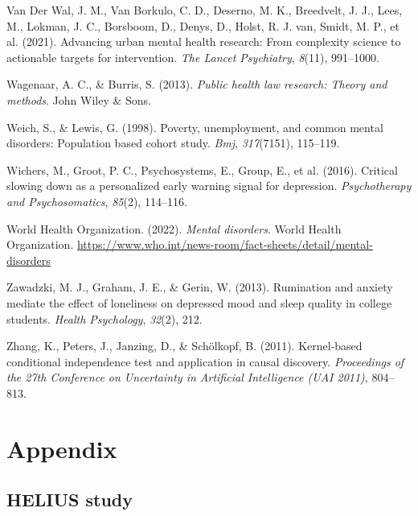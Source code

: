 \documentclass[
]{article}
\newlength{\cslhangindent}
\newenvironment{CSLReferences}[2] %
 {\begin{list}{}{%
  \setlength{\itemindent}{0pt}
  \setlength{\leftmargin}{0pt}
  \setlength{\parsep}{0pt}
  \ifodd #1
   \setlength{\leftmargin}{\cslhangindent}
   \setlength{\itemindent}{-1\cslhangindent}
  \fi
  \setlength{\itemsep}{#2\baselineskip}}}
 {\end{list}}
\begin{document}
\begin{CSLReferences}{1}{0}
Van Der Wal, J. M., Van Borkulo, C. D., Deserno, M. K., Breedvelt, J.
J., Lees, M., Lokman, J. C., Borsboom, D., Denys, D., Holst, R. J. van,
Smidt, M. P., et al. (2021). Advancing urban mental health research:
From complexity science to actionable targets for intervention.
\emph{The Lancet Psychiatry}, \emph{8}(11), 991--1000.

Wagenaar, A. C., \& Burris, S. (2013). \emph{Public health law research:
Theory and methods}. John Wiley \& Sons.

Weich, S., \& Lewis, G. (1998). Poverty, unemployment, and common mental
disorders: Population based cohort study. \emph{Bmj}, \emph{317}(7151),
115--119.

Wichers, M., Groot, P. C., Psychosystems, E., Group, E., et al. (2016).
Critical slowing down as a personalized early warning signal for
depression. \emph{Psychotherapy and Psychosomatics}, \emph{85}(2),
114--116.

World Health Organization. (2022). \emph{Mental disorders}. World Health
Organization.
\url{https://www.who.int/news-room/fact-sheets/detail/mental-disorders}

Zawadzki, M. J., Graham, J. E., \& Gerin, W. (2013). Rumination and
anxiety mediate the effect of loneliness on depressed mood and sleep
quality in college students. \emph{Health Psychology}, \emph{32}(2),
212.

Zhang, K., Peters, J., Janzing, D., \& Schölkopf, B. (2011).
Kernel-based conditional independence test and application in causal
discovery. \emph{Proceedings of the 27th Conference on Uncertainty in
Artificial Intelligence (UAI 2011)}, 804--813.

\end{CSLReferences}

\section{Appendix}\label{sec-appendix}

\subsection{HELIUS study}\label{sec-helius}
\end{document}

